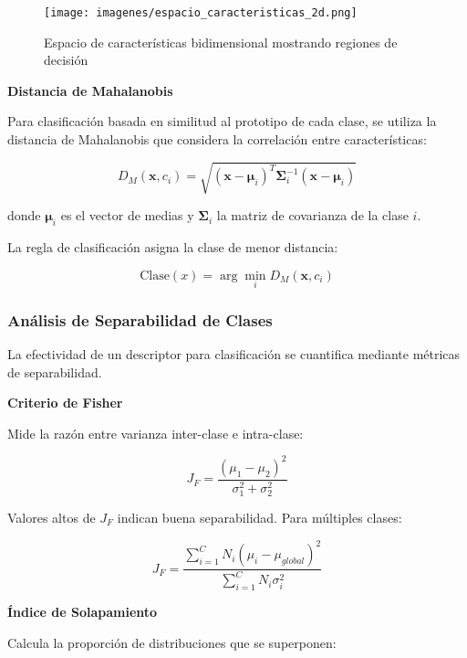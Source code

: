 \begin{figure}[h]
\centering
\texttt{[image: imagenes/espacio\_caracteristicas\_2d.png]}
\caption{Espacio de características bidimensional mostrando regiones de decisión}
\label{fig:espacio_caracteristicas}
\end{figure}

\textbf{Distancia de Mahalanobis}

Para clasificación basada en similitud al prototipo de cada clase, se utiliza la distancia de Mahalanobis que considera la correlación entre características:

\begin{equation}
D_M(\mathbf{x}, c_i) = \sqrt{(\mathbf{x} - \boldsymbol{\mu}_i)^T \boldsymbol{\Sigma}_i^{-1} (\mathbf{x} - \boldsymbol{\mu}_i)}
\end{equation}

donde $\boldsymbol{\mu}_i$ es el vector de medias y $\boldsymbol{\Sigma}_i$ la matriz de covarianza de la clase $i$.

La regla de clasificación asigna la clase de menor distancia:

\begin{equation}
\text{Clase}(x) = \arg\min_{i} D_M(\mathbf{x}, c_i)
\end{equation}

\subsubsection{Análisis de Separabilidad de Clases}

La efectividad de un descriptor para clasificación se cuantifica mediante métricas de separabilidad.

\textbf{Criterio de Fisher}

Mide la razón entre varianza inter-clase e intra-clase:

\begin{equation}
J_F = \frac{(\mu_1 - \mu_2)^2}{\sigma_1^2 + \sigma_2^2}
\end{equation}

Valores altos de $J_F$ indican buena separabilidad. Para múltiples clases:

\begin{equation}
J_F = \frac{\sum_{i=1}^{C} N_i(\mu_i - \mu_{global})^2}{\sum_{i=1}^{C} N_i \sigma_i^2}
\end{equation}

\textbf{Índice de Solapamiento}

Calcula la proporción de distribuciones que se superponen:

